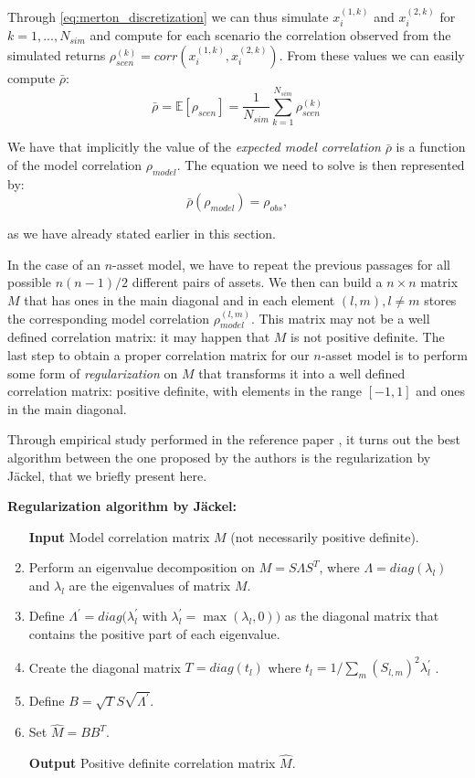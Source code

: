 Through \eqref{eq:merton_discretization} we can thus simulate $ x_i^{(1,k)}$ and 
$ x_i^{(2,k)}$ for $k= 1, ... ,N_{sim}$  and compute for each scenario the correlation observed from the simulated returns $\rho_{scen}^{(k)} = corr(x_i^{(1,k)}, x_i^{(2,k)})$.
From these values we can easily compute $\bar{\rho}$:
\begin{equation}
\label{eq:expected_model_correlation}
	\bar{\rho} = \mathbb{E} [\rho_{scen}] = \frac{1 }{N_{sim}} \sum_{k=1}^{N_{sim}} \rho_{scen}^{(k)}
\end{equation}


We have that implicitly the value of the \textit{expected model correlation} $\bar{\rho}$ is a function of the model correlation $\rho_{model}$. The equation we need to solve is then represented by:
\begin{equation}
\label{eq:expected_observed}
\bar{\rho}(\rho_{model}) = \rho_{obs},
\end{equation}

as we have already stated earlier in this section.

\bigskip
In the case of an $n$-asset model, we have to repeat the previous passages for all possible $n(n-1)/2 $ different pairs of assets. We then can build a $n \times n$ matrix $M$ that has ones in the main diagonal and in each element $(l,m), l \neq m$ stores the corresponding model correlation $\rho_{model}^{(l,m)}$.
This matrix may not be a well defined correlation matrix: it may happen that $M$ is not positive definite.
The last step to obtain a proper correlation matrix for our $n$-asset model is to perform some form of \textit{regularization} on $M$ that transforms it into a well defined correlation matrix: positive definite, with elements in the range $[-1,1]$ and ones in the main diagonal.

Through empirical study performed in the reference paper \cite{PARSIMONIOUS2011}, it turns out the best algorithm between the one proposed by the authors is the regularization by J\"ackel, that we briefly present here.

\bigskip
\textbf{Regularization algorithm by J\"ackel:}
\begin{enumerate}
	\item[\textbf{Input}] Model correlation matrix $M$ (not necessarily positive definite).
	\item Perform an eigenvalue decomposition on $M  = S \Lambda S^T$, where $\Lambda = diag(\lambda_l)$ and $\lambda_l$ are the eigenvalues of matrix $M$.
	\item Define $\Lambda^{'} = diag(\lambda_l^{'}$ with $\lambda_l^{'} = \max(\lambda_l, 0))$ as the diagonal matrix that contains the positive part of each eigenvalue.
	\item Create the diagonal matrix $T = diag(t_l)$ where $t_l =1 / \sum_{m} (S_{l,m})^2 \lambda_l^{'}$ .
	\item Define $B = \sqrt{T} S \sqrt{\Lambda^{'}}$.
	\item Set $\widehat{M} = B B^T$.
	\item[\textbf{Output}] Positive definite correlation matrix $\widehat{M}$.
\end{enumerate}

